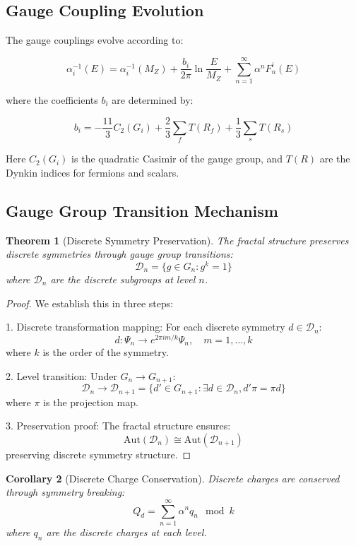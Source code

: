 \documentclass[12pt]{article}
\newtheorem{theorem}{Theorem}[section]
\newtheorem{corollary}[theorem]{Corollary}
\begin{document}
\subsection{Gauge Coupling Evolution}

The gauge couplings evolve according to:

\begin{equation}
\alpha_i^{-1}(E) = \alpha_i^{-1}(M_Z) + \frac{b_i}{2\pi}\ln\frac{E}{M_Z} + \sum_{n=1}^{\infty} \alpha^n F_n^i(E)
\end{equation}

where the coefficients $b_i$ are determined by:

\begin{equation}
b_i = -\frac{11}{3}C_2(G_i) + \frac{2}{3}\sum_f T(R_f) + \frac{1}{3}\sum_s T(R_s)
\end{equation}

Here $C_2(G_i)$ is the quadratic Casimir of the gauge group, and $T(R)$ are the Dynkin indices for fermions and scalars.

\subsection{Gauge Group Transition Mechanism}

\begin{theorem}[Discrete Symmetry Preservation]
The fractal structure preserves discrete symmetries through gauge group transitions:
\[
\mathcal{D}_n = \{g \in G_n : g^k = 1\}
\]
where $\mathcal{D}_n$ are the discrete subgroups at level $n$.
\end{theorem}

\begin{proof}
We establish this in three steps:

1. Discrete transformation mapping:
   For each discrete symmetry $d \in \mathcal{D}_n$:
   \[
   d: \Psi_n \to e^{2\pi i m/k}\Psi_n, \quad m = 1,\ldots,k
   \]
   where $k$ is the order of the symmetry.

2. Level transition:
   Under $G_n \to G_{n+1}$:
   \[
   \mathcal{D}_n \to \mathcal{D}_{n+1} = \{d' \in G_{n+1} : \exists d \in \mathcal{D}_n, d'\pi = \pi d\}
   \]
   where $\pi$ is the projection map.

3. Preservation proof:
   The fractal structure ensures:
   \[
   \text{Aut}(\mathcal{D}_n) \cong \text{Aut}(\mathcal{D}_{n+1})
   \]
   preserving discrete symmetry structure.
\end{proof}

\begin{corollary}[Discrete Charge Conservation]
Discrete charges are conserved through symmetry breaking:
\[
Q_d = \sum_{n=1}^{\infty} \alpha^n q_n \mod k
\]
where $q_n$ are the discrete charges at each level.
\end{corollary}
\end{document}
